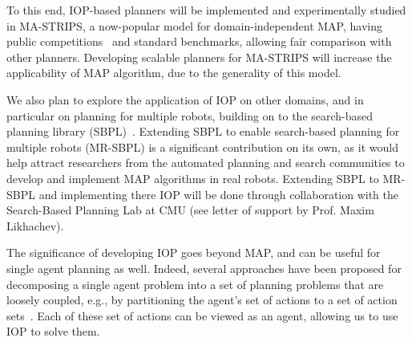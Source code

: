 \documentclass[11pt]{article}
\begin{document}
To this end, IOP-based planners will be implemented and experimentally studied in MA-STRIPS, a now-popular model for domain-independent MAP, having public competitions~\cite{vstolba2015competition} and standard benchmarks, allowing fair comparison with other planners. Developing scalable planners for MA-STRIPS will increase the applicability of MAP algorithm, due to the generality of this model. 

We also plan to explore the application of IOP on other domains, and in particular on planning for multiple robots, building on to the search-based planning library (SBPL)~\cite{likhachev2010sbpl}. Extending SBPL to enable search-based planning for multiple robots (MR-SBPL) is a significant contribution on its own, as it would help attract researchers from the automated planning and search communities to develop and implement MAP algorithms in real robots. Extending SBPL to MR-SBPL and implementing there IOP will be done through collaboration with the Search-Based Planning Lab at CMU (see letter of support by Prof. Maxim Likhachev). 



The significance of developing IOP goes beyond MAP, and can be useful for single agent planning as well. Indeed, several approaches have been proposed for decomposing a single agent problem into a set of planning problems that are loosely coupled, e.g., by partitioning the agent's set of actions to a set of action sets~\cite{amir2003factored,nissim2012tunneling}. Each of these set of actions can be viewed as an agent, allowing us to use IOP to solve them. 





\end{document}

